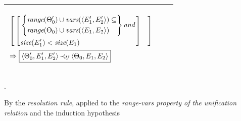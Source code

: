 \documentclass[runningheads]{llncs}
\DeclareMathOperator{\uand}{\emph{and}\,}
\DeclareMathOperator{\uimplies}{\Rightarrow}
\begin{document}
  \begin{center}
  \begin{tabular}{|m{}|m{}||m{}|}
\hline
 \begin{center}
    $
    \begin{aligned}
      &\left[\begin{aligned}
&\left[\begin{aligned}
 &\left\{\begin{aligned}
 &\range(\Thet{0}')\cup\vars(\langle  \E{1}', \E{2}' \rangle) \subseteq \\
  &\range(\Thet{0})\cup\vars(\langle \E{1}, \E{2} \rangle) 
  \end{aligned}\right\} \uand  \\
  &\size(\E{1}') < \size(\E{1})
  \end{aligned} \right] 
  \end{aligned} \right]
      \\
 & \uimplies \,  \begin{aligned}
 &\boxed{\langle \Thet{0}', \E{1}', \E{2}' \rangle 
 \, \expsub{\prec}{\var{U}}\, 
 \langle \Thet{0}, \E{1}, \E{2} \rangle}
 \end{aligned} 
  \end{aligned} 
    $
 \end{center}
  & &  \\  \hline
\end{tabular}.
\end{center}


By the \emph{resolution rule}, applied to the \emph{range-vars property of the unification relation} and the induction hypothesis
\end{document}
